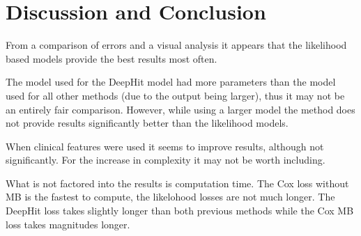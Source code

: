 \vspace{-0.25cm}

\section{Discussion and Conclusion} \label{sec:discussion}
    From a comparison of errors and a visual analysis it appears that the likelihood based models provide the best results most often.
    
    The model used for the DeepHit model had more parameters than the model used for all other methods (due to the output being larger), thus it may not be an entirely fair comparison. However, while using a larger model the method does not provide results significantly better than the likelihood models.
    
    When clinical features were used it seems to improve results, although not significantly. For the increase in complexity it may not be worth including.
    
    What is not factored into the results is computation time. The Cox loss without \gls{MB} is the fastest to compute, the likelohood losses are not much longer. The DeepHit loss takes slightly longer than both previous methods while the Cox \gls{MB} loss takes magnitudes longer.


